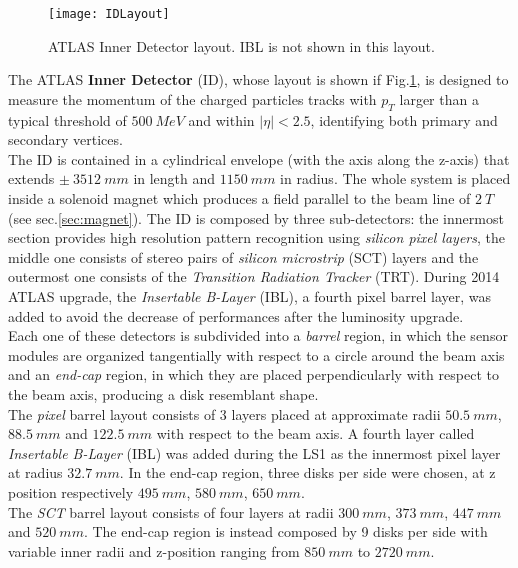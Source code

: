 \documentclass[a4paper,twoside,12pt]{article}
\begin{document}
\begin{figure} [h]
	\texttt{[image: IDLayout]}
	\caption{ATLAS Inner Detector layout\cite{Aad:2008zzm}. IBL is not shown in this layout.}
	\label{fig:IDLayout}
\end{figure}

The ATLAS \textbf{Inner Detector} (ID), whose layout is shown if Fig.\ref{fig:IDLayout}, is designed to measure the momentum of the
charged particles tracks with $p_{T}$ larger than a typical threshold of $500\ MeV$ and 
within $|\eta| < 2.5$, identifying both primary and secondary vertices\cite{Aad:2008zzm}. \\

The ID is contained in a cylindrical envelope (with the axis along the z-axis) that extends
$\pm\ 3512\ mm$ in length and $1150\ mm$ in radius. The whole system is placed inside
a solenoid magnet which produces a field parallel to the beam line of $2\ T$(see sec.\ref{sec:magnet}). The ID is composed by three sub-detectors: the innermost section provides
high resolution pattern recognition using \textit{silicon pixel layers}, the middle one consists of stereo pairs of \textit{silicon microstrip} (SCT) layers and the outermost one consists of the \textit{Transition Radiation Tracker} (TRT). During 2014 ATLAS upgrade, the \textit{Insertable B-Layer} (IBL), a fourth pixel barrel layer, was added to avoid the decrease of performances after the luminosity upgrade. \\

Each one of these detectors is subdivided into a \textit{barrel} region, in which the sensor modules 
are organized tangentially with respect to a circle around the beam axis and an \textit{end-cap} region, in which they are placed perpendicularly with respect to the beam axis, producing
a disk resemblant shape.\\

The \textit{pixel} barrel layout consists of 3 layers placed at approximate radii $50.5\ mm$, $88.5\ mm$ and $122.5\ mm$ with respect to the beam 
axis. A fourth layer called \textit{Insertable B-Layer} (IBL) was added during the LS1 as the
innermost pixel layer at radius $32.7\ mm$. In the end-cap region, three disks per side were chosen,
at z position respectively $495\ mm$, $580\ mm$, $650\ mm$. \\

The \textit{SCT} barrel layout consists of four layers at radii $300\ mm$, $373\ mm$, $447\ mm$ and $520\ mm$. The end-cap region is instead composed by 9 disks per side with variable
inner radii and z-position ranging from $850\ mm$ to $2720\ mm$. \\
\end{document}
